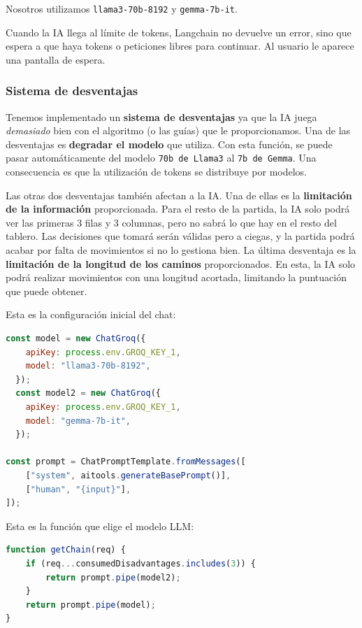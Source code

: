 \documentclass[12pt,epsf,titlepage,a4paper]{article}
\begin{document}
Nosotros utilizamos \texttt{llama3-70b-8192} y \texttt{gemma-7b-it}.

Cuando la IA llega al límite de tokens, Langchain no devuelve un error, sino que espera a que haya tokens o peticiones libres para continuar. Al usuario le aparece una pantalla de espera.

\subsubsection{Sistema de desventajas}

Tenemos implementado un \textbf{sistema de desventajas} ya que la IA juega \emph{demasiado} bien con el algoritmo (o las guías) que le proporcionamos. Una de las desventajas es \textbf{degradar el modelo} que utiliza. Con esta función, se puede pasar automáticamente del modelo \verb|70b de Llama3| al \verb|7b de Gemma|. Una consecuencia es que la utilización de tokens se distribuye por modelos.

Las otras dos desventajas también afectan a la IA. Una de ellas es la \textbf{limitación de la información} proporcionada. Para el resto de la partida, la IA solo podrá ver las primeras 3 filas y 3 columnas, pero no sabrá lo que hay en el resto del tablero. Las decisiones que tomará serán válidas pero a ciegas, y la partida podrá acabar por falta de movimientos si no lo gestiona bien. La última desventaja es la \textbf{limitación de la longitud de los caminos} proporcionados. En esta, la IA solo podrá realizar movimientos con una longitud acortada, limitando la puntuación que puede obtener. 

Esta es la configuración inicial del chat:
\begin{lstlisting}[language=JavaScript]
const model = new ChatGroq({
    apiKey: process.env.GROQ_KEY_1,
    model: "llama3-70b-8192",
  });
  const model2 = new ChatGroq({
    apiKey: process.env.GROQ_KEY_1,
    model: "gemma-7b-it",
  });

const prompt = ChatPromptTemplate.fromMessages([
    ["system", aitools.generateBasePrompt()],
    ["human", "{input}"],
]);
\end{lstlisting}


\vspace{5mm}
Esta es la función que elige el modelo LLM:
\begin{lstlisting}[language=JavaScript]
function getChain(req) {
    if (req...consumedDisadvantages.includes(3)) {
        return prompt.pipe(model2);
    }
    return prompt.pipe(model);
}
\end{lstlisting}
\end{document}
